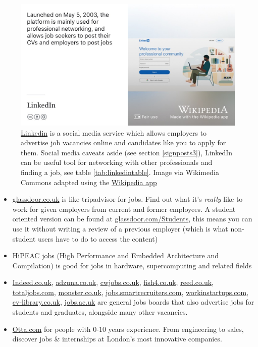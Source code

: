\documentclass[
]{book}
\providecommand{\tightlist}{%
  \setlength{\itemsep}{0pt}\setlength{\parskip}{0pt}}
\begin{document}
\begin{figure}

{\centering \includegraphics[width=0.9\linewidth]{images/linkedin} 

}

\caption{\href{https://en.wikipedia.org/wiki/LinkedIn}{Linkedin} is a social media service which allows employers to advertise job vacancies online and candidates like you to apply for them. Social media caveats aside (see section \ref{signposts3}), LinkedIn can be useful tool for networking with other professionals and finding a job, see table \ref{tab:linkedintable}. Image via Wikimedia Commons adapted using the \href{https://apps.apple.com/us/app/wikipedia/id324715238}{Wikipedia app}}\label{fig:linkedin-fig}
\end{figure}



\begin{itemize}
\tightlist
\item
  \href{http://www.glassdoor.co.uk/}{glassdoor.co.uk} is like tripadvisor for jobs. Find out what it's \emph{really} like to work for given employers from current and former employees. A student oriented version can be found at \href{https://www.glassdoor.com/Students}{glassdoor.com/Students}, this means you can use it without writing a review of a previous employer (which is what non-student users have to do to access the content)
\item
  \href{https://www.hipeac.net/jobs}{HiPEAC jobs} (High Performance and Embedded Architecture and Compilation) is good for jobs in hardware, supercomputing and related fields
\item
  \href{http://www.indeed.co.uk}{Indeed.co.uk}, \href{https://www.adzuna.co.uk}{adzuna.co.uk}, \href{https://www.cwjobs.co.uk/}{cwjobs.co.uk}, \href{https://www.fish4.co.uk}{fish4.co.uk}, \href{https://www.reed.co.uk/}{reed.co.uk}, \href{https://www.totaljobs.com}{totaljobs.com}, \href{https://www.monster.co.uk}{monster.co.uk}, \href{https://jobs.smartrecruiters.com}{jobs.smartrecruiters.com}, \href{https://workinstartups.com}{workinstartups.com}, \href{https://www.cv-library.co.uk}{cv-library.co.uk}, \href{https://www.jobs.ac.uk}{jobs.ac.uk} are general jobs boards that also advertise jobs for students and graduates, alongside many other vacancies.
\item
  \href{https://otta.com/}{Otta.com} for people with 0-10 years experience. From engineering to sales, discover jobs \& internships at London's most innovative companies.
\end{itemize}
\end{document}
